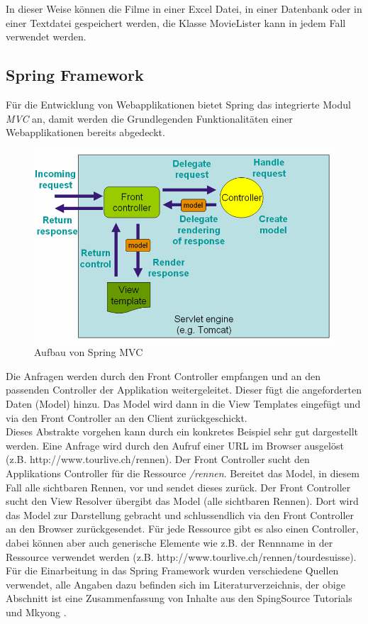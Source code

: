 In dieser Weise können die Filme in einer Excel Datei, in einer Datenbank oder in einer Textdatei gespeichert werden, die Klasse MovieLister kann in jedem Fall verwendet werden.

\subsection{Spring Framework}
Für die Entwicklung von Webapplikationen bietet Spring das integrierte Modul \textit{MVC} an, damit werden die Grundlegenden Funktionalitäten einer Webapplikationen bereits abgedeckt.

\begin{figure}[H]
	\centering
	\includegraphics[width=130mm]{images/tourliveweb/springmvc.png}
	\caption{Aufbau von Spring MVC \cite{springsourcemvc2011}}
	\label{fig:springmvc}
\end{figure}

Die Anfragen werden durch den Front Controller empfangen und an den passenden Controller der Applikation weitergeleitet. Dieser fügt die angeforderten Daten (Model) hinzu. Das Model wird dann in die View Templates eingefügt und via den Front Controller an den Client zurückgeschickt.
\\

Dieses Abstrakte vorgehen kann durch ein konkretes Beispiel sehr gut dargestellt werden. Eine Anfrage wird durch den Aufruf einer URL im Browser ausgelöst (z.B. http://www.tourlive.ch/rennen). Der Front Controller sucht den Applikations Controller für die Ressource \textit{/rennen}. Bereitet das Model, in diesem Fall alle sichtbaren Rennen, vor und sendet dieses zurück. Der Front Controller sucht den View Resolver übergibt das Model (alle sichtbaren Rennen). Dort wird das Model zur Darstellung gebracht und schlussendlich via den Front Controller an den Browser zurückgesendet. Für jede Ressource gibt es also einen Controller, dabei können aber auch generische Elemente wie z.B. der Rennname in der Ressource verwendet werden (z.B. http://www.tourlive.ch/rennen/tourdesuisse).
\\

Für die Einarbeitung in das Spring Framework wurden verschiedene Quellen verwendet, alle Angaben dazu befinden sich im Literaturverzeichnis, der obige Abschnitt ist eine Zusammenfassung von Inhalte aus den SpingSource Tutorials \cite{springsourcemvc2011} und Mkyong \cite{springmvcexamples2011} .